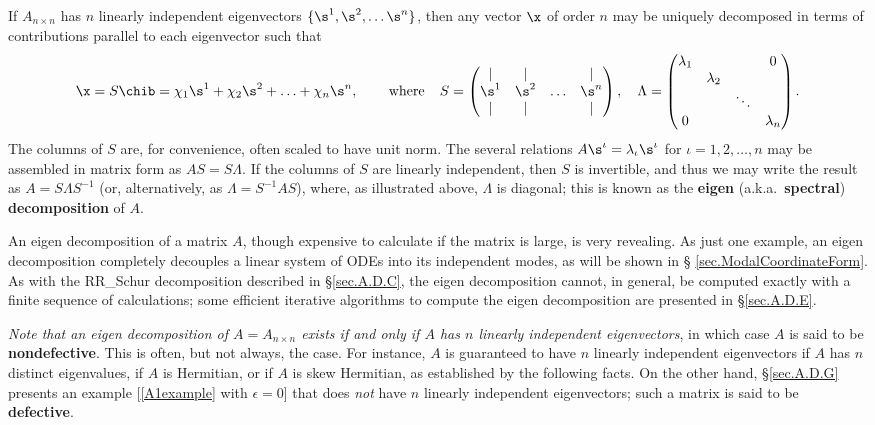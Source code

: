 If $A_{n\times n}$ has $n$ linearly independent eigenvectors
$\{\s^{1},\s^{2},\ldots \s^{n}\}$, then any vector $\x$ of order $n$
may be uniquely decomposed in terms of contributions parallel to each
eigenvector such that
\begin{equation*}
\x=S \chib = \chi_{1}\s^{1}+\chi_{2}\s^{2}+\ldots+\chi_{n}\s^{n}, \hskip0.3in \textrm{where} \hskip0.15in
S=\displaystyle \begin{pmatrix} | & | & & | \\ \s^1 & \s^2 & \ldots & \s^n \\  | & | & & | \end{pmatrix}, \quad
\Lambda=
       \begin{pmatrix} \lambda_1 &   &       & 0 \\
			 & \lambda_2 &       &   \\
			 &   &\ddots &   \\
		       0 &   &       & \lambda_n
		       \end{pmatrix}.
\end{equation*}
The columns of $S$ are, for convenience, often scaled to have unit
norm.  The several relations $A \s^\iota = \lambda_\iota \s^\iota$ for
$\iota = 1, 2, \ldots, n$ may be assembled in matrix form as $A S
= S \Lambda$.  If the columns of $S$ are linearly independent, then
$S$ is invertible, and thus we may write the result as $A = S \Lambda
S^{-1}$ (or, alternatively, as $\Lambda = S^{-1} A S$), where, as
illustrated above, $\Lambda$ is diagonal; this is known as the {\bf eigen} (a.k.a.~{\bf spectral}) {\bf decomposition} of $A$.  

An eigen decomposition of a matrix $A$,
though expensive to calculate if the matrix is large, is very revealing.
As just one example, an eigen decomposition completely decouples
a linear system of ODEs into its independent modes, as will be shown in \S
\ref{sec.ModalCoordinateForm}. As with the RR_Schur decomposition
described in \S \ref{sec.A.D.C}, the eigen decomposition cannot, in
general, be computed exactly with a finite sequence of calculations;
some efficient iterative algorithms to compute the eigen decomposition
are presented in \S \ref{sec.A.D.E}.

{\it Note that an eigen decomposition of $A=A_{n\times n}$
exists if and only if $A$ has $n$ linearly independent eigenvectors}, in which case $A$ is said to be {\bf nondefective}.
This is often, but not always, the case.  For instance, $A$ is
guaranteed to have $n$ linearly independent eigenvectors if $A$ has
$n$ distinct eigenvalues, if $A$ is Hermitian, or if $A$ is skew
Hermitian, as established by the following facts.  On the other hand,
\S \ref{sec.A.D.G} presents an example [\eqref{A1example} with
$\epsilon=0$] that does {\it not} have $n$ linearly independent
eigenvectors; such a matrix is said to be {\bf defective}.

